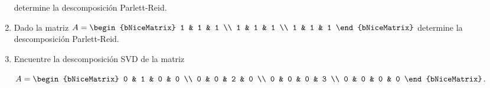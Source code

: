 \documentclass[
	spanish,
	8pt,
	utf8,
	xcolor=table,
	handout,
	aspectratio=169,
	professionalfonts,
	notheorems,
	mathserif,
]{beamer}
\newcounter{savedenum}
\newcommand*{\saveenum}{\setcounter{savedenum}{\theenumi}}
\begin{document}
\begin{frame}
\begin{enumerate}
		      determine la descomposición Parlett-Reid.

		\item

		      Dado la matriz
		      \begin{math}
			      A=
			      \begin{bNiceMatrix}
				      1 & 1 & 1 \\
				      1 & 1 & 1 \\
				      1 & 1 & 1
			      \end{bNiceMatrix}
		      \end{math}
		      determine la descomposición Parlett-Reid.

		\item


		      Encuentre la descomposición SVD de la matriz

		      \begin{math}
			      A=
			      \begin{bNiceMatrix}
				      0 & 1 & 0 & 0 \\
				      0 & 0 & 2 & 0 \\
				      0 & 0 & 0 & 3 \\
				      0 & 0 & 0 & 0
			      \end{bNiceMatrix}
		      \end{math}.

		      \saveenum
	\end{enumerate}
\end{frame}
\end{document}
